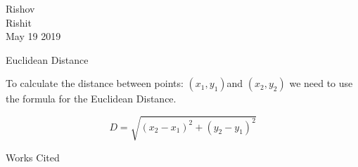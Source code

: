 \documentclass[12pt]{article}
\newenvironment{workscited}{\newpage \begin{center} Works Cited \end{center}}{\newpage }
\begin{document}
\begin{flushleft}

Rishov\\
Rishit\\
May 19 2019\\


\begin{center}
Euclidean Distance
\end{center}


\setlength{\parindent}{0.5in}
To calculate the distance between points: $ (x_1, y_1)  $and $ (x_2, y_2) $ we need to use the formula for the Euclidean Distance.

$$ D = \sqrt{(x_2 - x_1)^2 + (y_2 - y_1)^2} $$

\setlength{\parindent}{0.5in}


\begin{workscited}



\end{workscited}

\end{flushleft}
\end{document}
